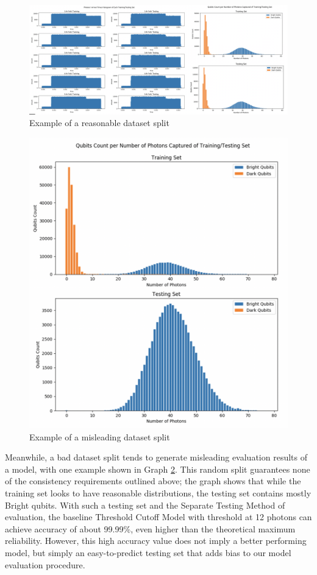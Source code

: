 \documentclass[letterpaper,twocolumn,10pt]{article}
\begin{document}
\begin{figure}[]
    \includegraphics[width=2\columnwidth]{Figures/datasplit_good.png}
    \centering
    \caption{Example of a reasonable dataset split}
    \label{fig:datasplit_good}
\end{figure}

\begin{figure}[]
    \includegraphics[width=\linewidth]{Figures/datasplit_bad.png}
    \centering
    \caption{Example of a misleading dataset split}
    \label{fig:datasplit_bad}
\end{figure}

Meanwhile, a bad dataset split tends to generate misleading evaluation results of a model, with one example shown in Graph \ref{fig:datasplit_bad}. This random split guarantees none of the consistency requirements outlined above; the graph shows that while the training set looks to have reasonable distributions, the testing set contains mostly Bright qubits. With such a testing set and the Separate Testing Method of evaluation, the baseline Threshold Cutoff Model with threshold at 12 photons can achieve accuracy of about 99.99\%, even higher than the theoretical maximum reliability. However, this high accuracy value does not imply a better performing model, but simply an easy-to-predict testing set that adds bias to our model evaluation procedure.
\end{document}
